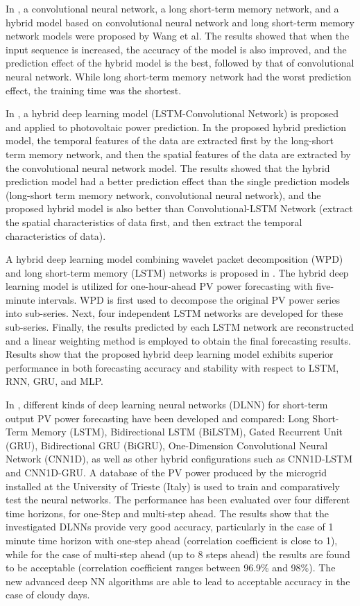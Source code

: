 In \cite{WANG2019113315}, a convolutional neural network, a long short-term memory network, and a hybrid model based on convolutional neural network and long short-term memory network models were proposed by Wang et al.
The results showed that when the input sequence is increased, the accuracy of the model is also improved, and the prediction effect of the hybrid model is the best, followed by that of convolutional neural network.
While long short-term memory network had the worst prediction effect, the training time was the shortest.

In \cite{WANG2019116225}, a hybrid deep learning model (LSTM-Convolutional Network) is proposed and applied to photovoltaic power prediction.
In the proposed hybrid prediction model, the temporal features of the data are extracted first by the long-short term memory network, and then the spatial features of the data are extracted by the convolutional neural network model.
The results showed that the hybrid prediction model had a better prediction effect than the single prediction models (long-short term memory network, convolutional neural network), and the proposed hybrid model is also better than Convolutional-LSTM Network (extract the spatial characteristics of data first, and then extract the temporal characteristics of data).

A hybrid deep learning model combining wavelet packet decomposition (WPD) and long short-term memory (LSTM) networks is proposed in \cite{LI2020114216}.
The hybrid deep learning model is utilized for one-hour-ahead PV power forecasting with five-minute intervals.
WPD is first used to decompose the original PV power series into sub-series.
Next, four independent LSTM networks are developed for these sub-series.
Finally, the results predicted by each LSTM network are reconstructed and a linear weighting method is employed to obtain the final forecasting results.
Results show that the proposed hybrid deep learning model exhibits superior performance in both forecasting accuracy and stability with respect to LSTM, RNN, GRU, and MLP.

In \cite{MELLIT2021276}, different kinds of deep learning neural networks (DLNN) for short-term output PV power forecasting have been developed and compared: Long Short-Term Memory (LSTM), Bidirectional LSTM (BiLSTM), Gated Recurrent Unit (GRU), Bidirectional GRU (BiGRU), One-Dimension Convolutional Neural Network (CNN1D), as well as other hybrid configurations such as CNN1D-LSTM and CNN1D-GRU.
A database of the PV power produced by the microgrid installed at the University of Trieste (Italy) is used to train and comparatively test the neural networks.
The performance has been evaluated over four different time horizons, for one-Step and multi-step ahead.
The results show that the investigated DLNNs provide very good accuracy, particularly in the case of 1 minute time horizon with one-step ahead (correlation coefficient is close to 1), while for the case of multi-step ahead (up to 8 steps ahead) the results are found to be acceptable (correlation coefficient ranges between 96.9\% and 98\%).
The new advanced deep NN algorithms are able to lead to acceptable accuracy in the case of cloudy days.

